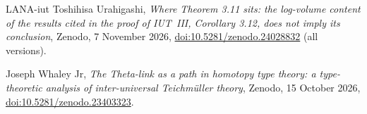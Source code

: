 \documentclass[11pt,a4paper]{article}
\theoremstyle{plain}
\theoremstyle{definition}
\theoremstyle{remark}
\begin{document}
\begin{thebibliography}{LANA-iut}
Toshihisa Urahigashi, \emph{Where {T}heorem 3.11 sits: the log-volume content of the results cited in the proof of
{IUT}~{III}, {C}orollary 3.12, does not imply its conclusion}, Zenodo, 7 November 2026,
\href{https://doi.org/10.5281/zenodo.24028832}{doi:10.5281/zenodo.24028832} (all versions).

Joseph Whaley Jr, \emph{The {T}heta-link as a path in homotopy type theory: a type-theoretic analysis of
inter-universal {T}eichm\"uller theory}, Zenodo, 15 October 2026,
\href{https://doi.org/10.5281/zenodo.23403323}{doi:10.5281/zenodo.23403323}.
\end{thebibliography}
\end{document}
